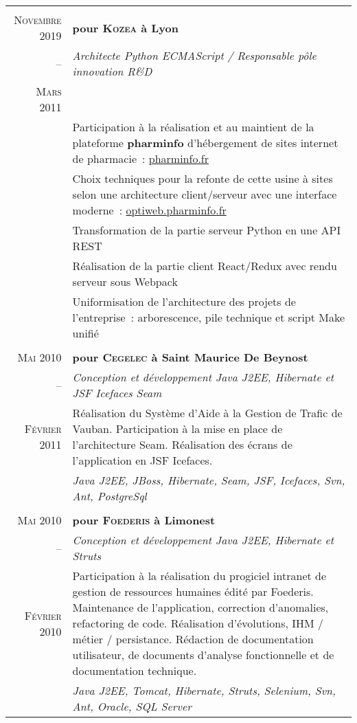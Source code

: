 \documentclass[a4paper,10pt]{article}
\begin{document}
\begin{supertabular}{r|p{11cm}}
   \\
  \textsc{Novembre} 2019  & \textbf{pour \textsc{Kozea} à Lyon} \\
  -- & \emph{Architecte Python ECMAScript / Responsable pôle innovation R\&D} \\
  \footnotesize{\textsc{Mars} 2011} \\
  & \footnotesize{Participation à la réalisation et au maintient de la plateforme \textbf{pharminfo} d’hébergement de sites internet de pharmacie : \href{https://www.pharminfo.fr}{pharminfo.fr}} \\
  & \footnotesize{Choix techniques pour la refonte de cette usine à sites selon une architecture client/serveur avec une interface moderne : \href{https://optiweb.pharminfo.fr}{optiweb.pharminfo.fr}} \\
  & \footnotesize{Transformation de la partie serveur Python en une API REST} \\
  & \footnotesize{Réalisation de la partie client React/Redux avec rendu serveur sous Webpack} \\
  & \footnotesize{Uniformisation de l’architecture des projets de l’entreprise : arborescence, pile technique et script Make unifié} \\



   \\
  \textsc{Mai} 2010  & \textbf{pour \textsc{Cegelec} à Saint Maurice De Beynost} \\
  -- & \emph{Conception et développement Java J2EE, Hibernate et JSF Icefaces Seam} \\
  \footnotesize{\textsc{Février} 2011} & \footnotesize{Réalisation du Système d’Aide à la Gestion de Trafic de Vauban. Participation à la mise en place de l’architecture Seam. Réalisation des écrans de l’application en JSF Icefaces.} \\
  & \emph{Java J2EE, JBoss, Hibernate, Seam, JSF, Icefaces, Svn, Ant, PostgreSql} \\


   \\
  \textsc{Mai} 2010 & \textbf{pour \textsc{Foederis} à Limonest} \\
  -- & \emph{Conception et développement Java J2EE, Hibernate et Struts} \\
  \footnotesize{\textsc{Février 2010}} & \footnotesize{Participation à la réalisation du progiciel intranet de gestion de ressources humaines édité par Foederis. Maintenance de l’application, correction d’anomalies, refactoring de code. Réalisation d’évolutions, IHM / métier / persistance. Rédaction de documentation utilisateur, de documents d’analyse fonctionnelle et de documentation technique.} \\
  & \emph{Java J2EE, Tomcat, Hibernate, Struts, Selenium, Svn, Ant, Oracle, SQL Server} \\



\end{supertabular}
\end{document}
